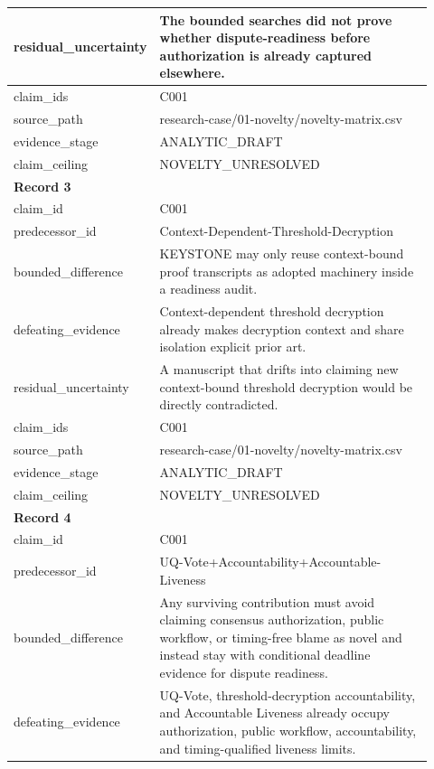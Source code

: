 \begin{longtable}{|p{0.24\linewidth}|p{0.68\linewidth}|}
residual\_\allowbreak{}uncertainty & The bounded searches did not prove whether dispute-readiness before authorization is already captured elsewhere. \\ \hline
claim\_\allowbreak{}ids & C001 \\ \hline
source\_\allowbreak{}path & research-case/01-novelty/novelty-matrix.csv \\ \hline
evidence\_\allowbreak{}stage & ANALYTIC\_\allowbreak{}DRAFT \\ \hline
claim\_\allowbreak{}ceiling & NOVELTY\_\allowbreak{}UNRESOLVED \\ \hline
\multicolumn{2}{|l|}{\textbf{Record 3}} \\ \hline
claim\_\allowbreak{}id & C001 \\ \hline
predecessor\_\allowbreak{}id & Context-Dependent-Threshold-Decryption \\ \hline
bounded\_\allowbreak{}difference & KEYSTONE may only reuse context-bound proof transcripts as adopted machinery inside a readiness audit. \\ \hline
defeating\_\allowbreak{}evidence & Context-dependent threshold decryption already makes decryption context and share isolation explicit prior art. \\ \hline
residual\_\allowbreak{}uncertainty & A manuscript that drifts into claiming new context-bound threshold decryption would be directly contradicted. \\ \hline
claim\_\allowbreak{}ids & C001 \\ \hline
source\_\allowbreak{}path & research-case/01-novelty/novelty-matrix.csv \\ \hline
evidence\_\allowbreak{}stage & ANALYTIC\_\allowbreak{}DRAFT \\ \hline
claim\_\allowbreak{}ceiling & NOVELTY\_\allowbreak{}UNRESOLVED \\ \hline
\multicolumn{2}{|l|}{\textbf{Record 4}} \\ \hline
claim\_\allowbreak{}id & C001 \\ \hline
predecessor\_\allowbreak{}id & UQ-Vote+Accountability+Accountable-Liveness \\ \hline
bounded\_\allowbreak{}difference & Any surviving contribution must avoid claiming consensus authorization, public workflow, or timing-free blame as novel and instead stay with conditional deadline evidence for dispute readiness. \\ \hline
defeating\_\allowbreak{}evidence & UQ-Vote, threshold-decryption accountability, and Accountable Liveness already occupy authorization, public workflow, accountability, and timing-qualified liveness limits. \\ \hline

\end{longtable}
